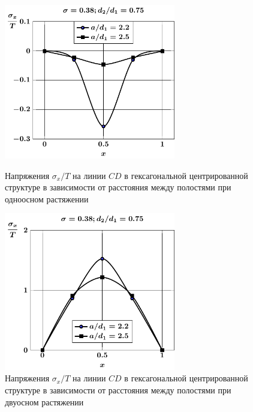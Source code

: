 \begin{figure}[h!]
\centering\footnotesize
\parbox[b]{7.5cm}{\centering\includegraphics[width=7.5cm]{cav13-a-d75-t1-sig_x-cd.pdf}
\caption{Напряжения $\sigma_x/T$ на линии $CD$ в гексагональной центрированной структуре в зависимости от расстояния между полостями при одноосном растяжении 
\label{f:9:50}}}\hfil\hfil
\parbox[b]{7.5cm}{\centering\includegraphics[width=7.5cm]{cav13-a-d75-t2-sig_x-cd.pdf}
\caption{Напряжения $\sigma_x/T$ на линии $CD$ в гексагональной центрированной структуре в зависимости от расстояния между полостями при двуосном растяжении
\label{f:9:51}}}
\end{figure}

